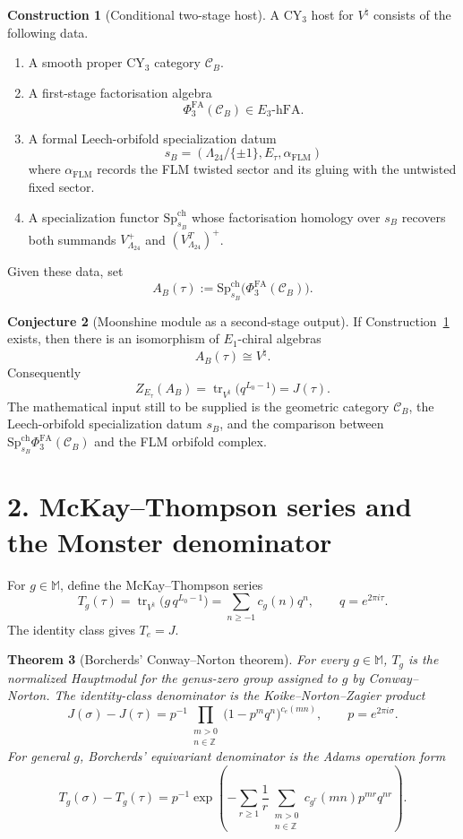 \documentclass[11pt]{article}
\providecommand{\Z}{\mathbb{Z}}
\providecommand{\Leech}{\Lambda_{24}}
\providecommand{\Vnat}{V^{\natural}}
\providecommand{\VLam}{V_{\Leech}}
\providecommand{\Mon}{\mathbb{M}}
\providecommand{\SpCh}{\mathrm{Sp}^{\mathrm{ch}}}
\providecommand{\PhiFA}{\Phi^{\mathrm{FA}}}
\providecommand{\ETHolFA}{E_3\text{-}\mathrm{hFA}}
\providecommand{\Tg}{T_g}
\providecommand{\Tr}{\operatorname{tr}}
\theoremstyle{plain}
\newtheorem{theorem}{Theorem}
\theoremstyle{definition}
\newtheorem{construction}[theorem]{Construction}
\newtheorem{conjecture}[theorem]{Conjecture}
\begin{document}
\begin{construction}[Conditional two-stage host]
\label{cons:vnat-two-stage}
A CY\(_3\) host for \(\Vnat\) consists of the following data.
\begin{enumerate}
\item A smooth proper CY\(_3\) category \(\mathcal C_B\).
\item A first-stage factorisation algebra
\[
  \PhiFA_3(\mathcal C_B)\in\ETHolFA .
\]
\item A formal Leech-orbifold specialization datum
\[
  s_B=(\Leech/\{\pm1\},E_\tau,\alpha_{\mathrm{FLM}})
\]
where \(\alpha_{\mathrm{FLM}}\) records the FLM twisted sector and its
gluing with the untwisted fixed sector.
\item A specialization functor \(\SpCh_{s_B}\) whose factorisation
homology over \(s_B\) recovers both summands
\(\VLam^+\) and \((\VLam^T)^+\).
\end{enumerate}
Given these data, set
\[
  A_B(\tau):=\SpCh_{s_B}\bigl(\PhiFA_3(\mathcal C_B)\bigr).
\]
\end{construction}

\begin{conjecture}[Moonshine module as a second-stage output]
\label{conj:vnat-two-stage}
If Construction~\ref{cons:vnat-two-stage} exists, then there is an
isomorphism of \(E_1\)-chiral algebras
\[
  A_B(\tau)\cong\Vnat .
\]
Consequently
\[
  Z_{E_\tau}(A_B)=\Tr_{\Vnat}\bigl(q^{L_0-1}\bigr)=J(\tau).
\]
The mathematical input still to be supplied is the geometric category
\(\mathcal C_B\), the Leech-orbifold specialization datum \(s_B\), and
the comparison between \(\SpCh_{s_B}\PhiFA_3(\mathcal C_B)\) and the
FLM orbifold complex.
\end{conjecture}

\section*{2. McKay--Thompson series and the Monster denominator}

For \(g\in\Mon\), define the McKay--Thompson series
\[
  \Tg(\tau)
  =
  \Tr_{\Vnat}\bigl(g\,q^{L_0-1}\bigr)
  =
  \sum_{n\geq -1}c_g(n)q^n,
  \qquad q=e^{2\pi i\tau}.
\]
The identity class gives \(T_e=J\).

\begin{theorem}[Borcherds' Conway--Norton theorem]
\label{thm:hauptmodul-borcherds}
For every \(g\in\Mon\), \(\Tg\) is the normalized Hauptmodul for the
genus-zero group assigned to \(g\) by Conway--Norton. The identity-class
denominator is the Koike--Norton--Zagier product
\[
  J(\sigma)-J(\tau)
  =
  p^{-1}
  \prod_{\substack{m>0\\ n\in\Z}}
  \bigl(1-p^m q^n\bigr)^{c_e(mn)},
  \qquad p=e^{2\pi i\sigma}.
\]
For general \(g\), Borcherds' equivariant denominator is the Adams
operation form
\[
  \Tg(\sigma)-\Tg(\tau)
  =
  p^{-1}
  \exp\!\left(
    -\sum_{r\geq1}\frac{1}{r}
     \sum_{\substack{m>0\\ n\in\Z}}
     c_{g^r}(mn)p^{mr}q^{nr}
  \right).
\]
\end{theorem}
\end{document}
